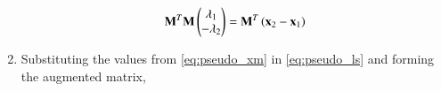 \begin{enumerate}[label=\thesubsection.\arabic*.,ref=\thesubsection.\theenumi]
\begin{align}
    \mathbf{M}^T\mathbf{M}\begin{pmatrix}\lambda_1\\-\lambda_2\end{pmatrix} = \mathbf{M}^T\left(\mathbf{x}_2-\mathbf{x}_1\right)
\label{eq:pseudo_ls}
\end{align}
\item Substituting the values from \eqref{eq:pseudo_xm} in \eqref{eq:pseudo_ls} and forming the augmented matrix,
\begin{align}

\end{align}
\end{enumerate}
